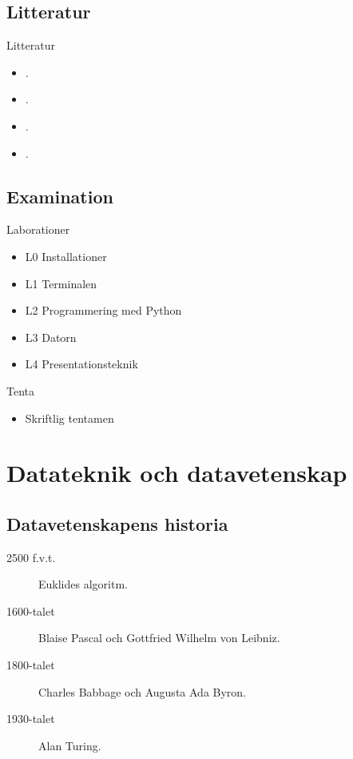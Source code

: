 \documentclass{beamer}
\begin{document}
\subsection{Litteratur}
\begin{frame}{Litteratur}
  \begin{itemize}
    \item {} \cite{Brookshear2012csa}.
    \item {} \cite{nemeth2011ual}.
    \item {} \cite{pythonkramaren1}.
    \item {} \cite{Oetiker2011lshort}.
  \end{itemize}
\end{frame}

\subsection{Examination}
\begin{frame}{Laborationer}
  \begin{itemize}
    \item L0 Installationer
    \item L1 Terminalen
    \item L2 Programmering med Python
    \item L3 Datorn
    \item L4 Presentationsteknik
  \end{itemize}
\end{frame}
\begin{frame}{Tenta}
  \begin{itemize}
    \item Skriftlig tentamen
  \end{itemize}
\end{frame}


\section{Datateknik och datavetenskap}

\subsection{Datavetenskapens historia}
\begin{frame}{\insertsubsectionhead}
  \begin{description}
    \item[2500 f.v.t.] Euklides algoritm.
    \item[1600-talet] Blaise Pascal och Gottfried Wilhelm von Leibniz.
    \item[1800-talet] Charles Babbage och Augusta Ada Byron.
    \item[1930-talet] Alan Turing.
  \end{description}
\end{frame}
\end{document}
